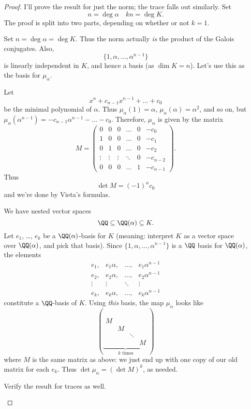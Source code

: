 \begin{proof}
I'll prove the result for just the norm; the trace falls out similarly.
Set
\[ n = \deg \alpha \quad kn = \deg K. \]
The proof is split into two parts, depending on whether or not $k=1$.
\begin{subproof}[Proof if $k=1$]
	Set $n = \deg \alpha = \deg K$.
	Thus the norm actually \emph{is} the product of the Galois conjugates.
	Also, \[ \{1, \alpha, \dots, \alpha^{n-1}\} \]
	is linearly independent in $K$, and hence a basis (as $\dim K = n$).
	Let's use this as the basis for $\mu_\alpha$.

	Let \[ x^n+c_{n-1}x^{n-1} + \dots + c_0  \]be the minimal polynomial of $\alpha$.
	Thus $\mu_\alpha(1) = \alpha$, $\mu_\alpha(\alpha) = \alpha^2$, and so on,
	but $\mu_\alpha(\alpha^{n-1}) = -c_{n-1}\alpha^{n-1} - \dots - c_0$.
	Therefore, $\mu_\alpha$ is given by the matrix
	\[
		M = 
		\left(
		\begin{array}{cccccc}
			0 & 0 & 0 & \dots & 0 & -c_0 \\
			1 & 0 & 0 & \dots & 0 & -c_1 \\
			0 & 1 & 0 & \dots & 0 & -c_2 \\
			\vdots & \vdots & \vdots & \ddots & 0 & -c_{n-2} \\
			0 & 0 & 0 & \dots & 1 & -c_{n-1}
		\end{array}
		\right).
	\]
	Thus \[ \det M = (-1)^n c_0 \] and we're done by Vieta's formulas.
\end{subproof}
\begin{subproof}[Proof if $k > 1$]
	We have nested vector spaces
	\[ \QQ \subseteq \QQ(\alpha) \subseteq K. \]
	Let $e_1$, \dots, $e_k$ be a $\QQ(\alpha)$-basis for $K$
	(meaning: interpret $K$ as a vector space over $\QQ(\alpha)$, and pick that basis).
	Since $\{1, \alpha, \dots, \alpha^{n-1}\}$ is a $\QQ$ basis for $\QQ(\alpha)$,
	the elements
	\[
		\begin{array}{cccc}
		e_1, & e_1\alpha, & \dots, & e_1\alpha^{n-1} \\
		e_2, & e_2\alpha, & \dots, & e_2\alpha^{n-1} \\
		\vdots & \vdots & \ddots & \vdots \\
		e_k, & e_k\alpha, & \dots, & e_k\alpha^{n-1}
		\end{array}
	\]
	constitute a $\QQ$-basis of $K$.
	Using \emph{this} basis, the map $\mu_\alpha$ looks like
	\[
		\left(
		\underbrace{
		\begin{array}{cccc}
			M & & & \\
			& M & & \\
			& & \ddots & \\
			& & & M
		\end{array}
		}_{\text{$k$ times}}
		\right)
	\]
	where $M$ is the same matrix as above:
	we just end up with one copy of our old matrix for each $e_k$.
	Thus $\det \mu_\alpha = (\det M)^k$, as needed. \qedhere
\end{subproof}
\begin{ques}
	Verify the result for traces as well. \qedhere
\end{ques}
\end{proof}

